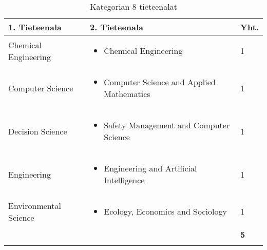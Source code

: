 \documentclass[utf8]{gradu3}
\begin{document}
\begin{longtable}[h]{|p{5cm}|p{8cm}|p{1cm}|}
    \hline
    \textbf{1. Tieteenala}    & \textbf{2. Tieteenala} & \textbf{Yht.} \\
    \hline
    Chemical Engineering & \begin{itemize}
        \item Chemical Engineering
    \end{itemize} & 1 \\
    \hline
    Computer Science & \begin{itemize}
        \item Computer Science and Applied Mathematics
    \end{itemize} & 1 \\
    \hline
    Decision Science & \begin{itemize}
        \item Safety Management and Computer Science
    \end{itemize} & 1 \\
    \hline
    Engineering & \begin{itemize}
        \item Engineering and Artificial Intelligence
    \end{itemize} & 1 \\
    \hline
    Environmental Science & \begin{itemize}
        \item Ecology, Economics and Sociology
    \end{itemize} & 1 \\
    \hline
       &   & \textbf{5} \\
    \hline
    \caption{Kategorian 8 tieteenalat}
    \label{table:Kategorian 8 tieteenalat}
\end{longtable}
\end{document}
